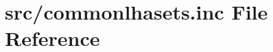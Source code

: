 \hypertarget{commonlhasets_8inc}{}\section{src/commonlhasets.inc File Reference}
\label{commonlhasets_8inc}
